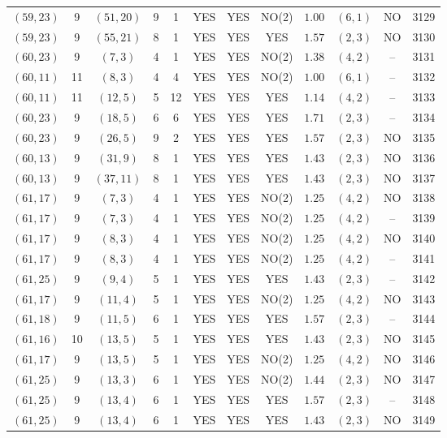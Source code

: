 \begin{longtable}{|c|c|c|c|c|c|c|c|c|c|c|c|}
$(59,23)$ & 9 & $(51,20)$ & 9 & 1 & YES & YES & NO(2) & $1.00$ & $(6,1)$ & NO & 3129\\
$(59,23)$ & 9 & $(55,21)$ & 8 & 1 & YES & YES & YES & $1.57$ & $(2,3)$ & NO & 3130\\
$(60,23)$ & 9 & $(7,3)$ & 4 & 1 & YES & YES & NO(2) & $1.38$ & $(4,2)$ & -- & 3131\\
$(60,11)$ & 11 & $(8,3)$ & 4 & 4 & YES & YES & NO(2) & $1.00$ & $(6,1)$ & -- & 3132\\
$(60,11)$ & 11 & $(12,5)$ & 5 & 12 & YES & YES & YES & $1.14$ & $(4,2)$ & -- & 3133\\
$(60,23)$ & 9 & $(18,5)$ & 6 & 6 & YES & YES & YES & $1.71$ & $(2,3)$ & -- & 3134\\
$(60,23)$ & 9 & $(26,5)$ & 9 & 2 & YES & YES & YES & $1.57$ & $(2,3)$ & NO & 3135\\
$(60,13)$ & 9 & $(31,9)$ & 8 & 1 & YES & YES & YES & $1.43$ & $(2,3)$ & NO & 3136\\
$(60,13)$ & 9 & $(37,11)$ & 8 & 1 & YES & YES & YES & $1.43$ & $(2,3)$ & NO & 3137\\
$(61,17)$ & 9 & $(7,3)$ & 4 & 1 & YES & YES & NO(2) & $1.25$ & $(4,2)$ & NO & 3138\\
$(61,17)$ & 9 & $(7,3)$ & 4 & 1 & YES & YES & NO(2) & $1.25$ & $(4,2)$ & -- & 3139\\
$(61,17)$ & 9 & $(8,3)$ & 4 & 1 & YES & YES & NO(2) & $1.25$ & $(4,2)$ & NO & 3140\\
$(61,17)$ & 9 & $(8,3)$ & 4 & 1 & YES & YES & NO(2) & $1.25$ & $(4,2)$ & -- & 3141\\
$(61,25)$ & 9 & $(9,4)$ & 5 & 1 & YES & YES & YES & $1.43$ & $(2,3)$ & -- & 3142\\
$(61,17)$ & 9 & $(11,4)$ & 5 & 1 & YES & YES & NO(2) & $1.25$ & $(4,2)$ & NO & 3143\\
$(61,18)$ & 9 & $(11,5)$ & 6 & 1 & YES & YES & YES & $1.57$ & $(2,3)$ & -- & 3144\\
$(61,16)$ & 10 & $(13,5)$ & 5 & 1 & YES & YES & YES & $1.43$ & $(2,3)$ & NO & 3145\\
$(61,17)$ & 9 & $(13,5)$ & 5 & 1 & YES & YES & NO(2) & $1.25$ & $(4,2)$ & NO & 3146\\
$(61,25)$ & 9 & $(13,3)$ & 6 & 1 & YES & YES & NO(2) & $1.44$ & $(2,3)$ & NO & 3147\\
$(61,25)$ & 9 & $(13,4)$ & 6 & 1 & YES & YES & YES & $1.57$ & $(2,3)$ & -- & 3148\\
$(61,25)$ & 9 & $(13,4)$ & 6 & 1 & YES & YES & YES & $1.43$ & $(2,3)$ & NO & 3149\\

\end{longtable}
